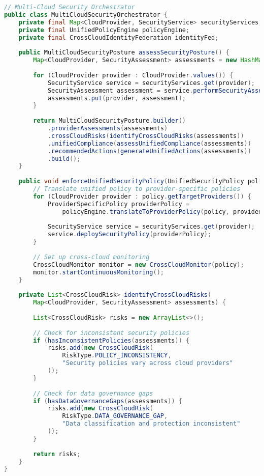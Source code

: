 \begin{lstlisting}[breaklines=true,basicstyle=\ttfamily\footnotesize,language=Java]
// Multi-Cloud Security Orchestrator
public class MultiCloudSecurityOrchestrator {
    private final Map<CloudProvider, SecurityService> securityServices;
    private final UnifiedPolicyEngine policyEngine;
    private final CrossCloudIdentityFederation identityFed;
    
    public MultiCloudSecurityPosture assessSecurityPosture() {
        Map<CloudProvider, SecurityAssessment> assessments = new HashMap<>();
        
        for (CloudProvider provider : CloudProvider.values()) {
            SecurityService service = securityServices.get(provider);
            SecurityAssessment assessment = service.performSecurityAssessment();
            assessments.put(provider, assessment);
        }
        
        return MultiCloudSecurityPosture.builder()
            .providerAssessments(assessments)
            .crossCloudRisks(identifyCrossCloudRisks(assessments))
            .unifiedCompliance(assessUnifiedCompliance(assessments))
            .recommendedActions(generateUnifiedActions(assessments))
            .build();
    }
    
    public void enforceUnifiedSecurityPolicy(UnifiedSecurityPolicy policy) {
        // Translate unified policy to provider-specific policies
        for (CloudProvider provider : policy.getTargetProviders()) {
            ProviderSpecificPolicy providerPolicy = 
                policyEngine.translateToProviderPolicy(policy, provider);
            
            SecurityService service = securityServices.get(provider);
            service.deploySecurityPolicy(providerPolicy);
        }
        
        // Set up cross-cloud monitoring
        CrossCloudMonitor monitor = new CrossCloudMonitor(policy);
        monitor.startContinuousMonitoring();
    }
    
    private List<CrossCloudRisk> identifyCrossCloudRisks(
        Map<CloudProvider, SecurityAssessment> assessments) {
        
        List<CrossCloudRisk> risks = new ArrayList<>();
        
        // Check for inconsistent security policies
        if (hasInconsistentPolicies(assessments)) {
            risks.add(new CrossCloudRisk(
                RiskType.POLICY_INCONSISTENCY,
                "Security policies vary across cloud providers"
            ));
        }
        
        // Check for data governance gaps
        if (hasDataGovernanceGaps(assessments)) {
            risks.add(new CrossCloudRisk(
                RiskType.DATA_GOVERNANCE_GAP,
                "Data classification and protection inconsistent"
            ));
        }
        
        return risks;
    }
}
\end{lstlisting}

